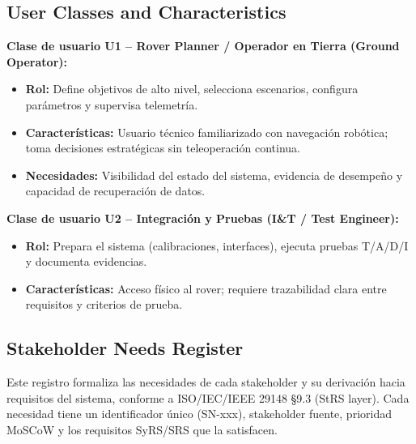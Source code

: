 \subsection{User Classes and Characteristics}

\textbf{Clase de usuario U1 – Rover Planner / Operador en Tierra (Ground Operator):}
\begin{itemize}
    \item \textbf{Rol:} Define objetivos de alto nivel, selecciona escenarios, configura parámetros y supervisa telemetría. \cite{segoldmine_ppi, nasa_cm}  
    \item \textbf{Características:} Usuario técnico familiarizado con navegación robótica; toma decisiones estratégicas sin teleoperación continua. \cite{nasa_cm, omg_sysml_mbse, segoldmine_ppi}  
    \item \textbf{Necesidades:} Visibilidad del estado del sistema, evidencia de desempeño y capacidad de recuperación de datos. \cite{nasa_cm, segoldmine_ppi}  
\end{itemize}

\textbf{Clase de usuario U2 – Integración y Pruebas (I\&T / Test Engineer):}
\begin{itemize}
    \item \textbf{Rol:} Prepara el sistema (calibraciones, interfaces), ejecuta pruebas T/A/D/I y documenta evidencias. \cite{segoldmine_ppi, nasa_cm}  
    \item \textbf{Características:} Acceso físico al rover; requiere trazabilidad clara entre requisitos y criterios de prueba. \cite{nasa_cm, segoldmine_ppi} 
\end{itemize}

\subsection{Stakeholder Needs Register}\label{subsec:stakeholder_needs}

Este registro formaliza las necesidades de cada stakeholder y su derivación hacia requisitos del sistema, conforme a ISO/IEC/IEEE 29148 §9.3 (StRS layer). Cada necesidad tiene un identificador único (SN-xxx), stakeholder fuente, prioridad MoSCoW y los requisitos SyRS/SRS que la satisfacen. \cite{nasa_cm, segoldmine_ppi, omg_sysml_mbse}

